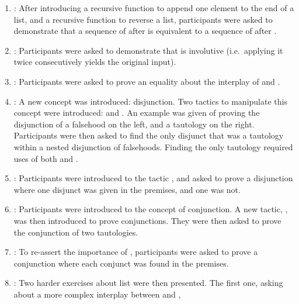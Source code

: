 \begin{enumerate}

  \item {}: After introducing a recursive function
 to append one element to the end of a list, and a recursive
function  to reverse a list, participants were asked to
demonstrate that a sequence of  after  is
equivalent to a sequence of  after .

  \item {}: Participants were asked to demonstrate that
 is involutive (i.e.\ applying it twice consecutively yields the
original input).

  \item {}: Participants were asked to prove an
equality about the interplay of  and .

  \item {}: A new concept was introduced: disjunction.
Two tactics to manipulate this concept were introduced:  and
.  An example was given of proving the disjunction of a
falsehood on the left, and a tautology on the right.  Participants were then
asked to find the only disjunct that was a tautology within a nested disjunction
of falsehoods.  Finding the only tautology required uses of both
 and .

  \item {}: Participants were introduced to the tactic
, and asked to prove a disjunction where one disjunct was given
in the premises, and one was not.

  \item {}: Participants were introduced to the concept of
conjunction.  A new tactic, , was then introduced to prove
conjunctions.  They were then asked to prove the conjunction of two tautologies.

  \item {}: To re-assert the importance of ,
participants were asked to prove a conjunction where each conjunct was found in
the premises.

  \item {}: Two harder exercises about list were then
presented.  The first one, asking about a more complex interplay between
 and ,


\end{enumerate}
